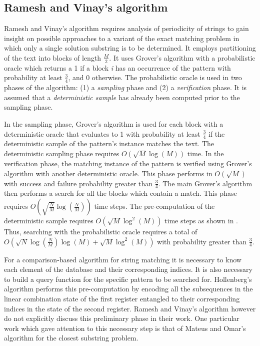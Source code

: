 \subsection{Ramesh and Vinay's algorithm}
Ramesh and Vinay's algorithm requires analysis of periodicity of strings to gain insight on possible approaches to a variant of the exact matching problem in which only a single solution substring is to be determined. It employs partitioning of the text into blocks of length $\frac{M}{2}$. It uses Grover's algorithm with a probabilistic oracle which returns a 1 if a block \textit{i} has an occurrence of the pattern with probability at least $\frac{3}{4}$, and 0 otherwise. The probabilistic oracle is used in two phases of the algorithm: (1) a \textit{sampling} phase and (2) a \textit{verification} phase. It is assumed that a \textit{deterministic sample} \cite{Vishkin1990} has already been computed prior to the sampling phase.

In the sampling phase, Grover's algorithm is used for each block with a deterministic oracle that evaluates to 1 with probability at least $\frac{3}{4}$ if the deterministic sample of the pattern's instance matches the text. The deterministic sampling phase requires $O(\sqrt{M}\log(M))$ time. In the verification phase, the matching instance of the pattern is verified using Grover's algorithm with another deterministic oracle. This phase performs in $O(\sqrt{M})$ with success and failure probability greater than $\frac{3}{4}$. The main Grover's algorithm then performs a search for all the blocks which contain a match. This phase requires $O(\sqrt{\frac{N}{M}}\log(\frac{N}{M}))$ time steps. The pre-computation of the deterministic sample requires $O(\sqrt{M}\log^2(M))$ time steps as shown in \cite{Ramesh2003}. Thus, searching with the probabilistic oracle requires a total of $O(\sqrt{N}\log(\frac{N}{M})\log(M) + \sqrt{M}\log^2(M))$ with probability greater than $\frac{3}{4}$.

For a comparison-based algorithm for string matching it is necessary to know each element of the database and their corresponding indices. It is also necessary to build a query function for the specific pattern to be searched for. Hollenberg's algorithm performs this pre-computation by encoding all the subsequences in the linear combination state of the first register entangled to their corresponding indices in the state of the second register. Ramesh and Vinay's algorithm however do not explicitly discuss this preliminary phase in their work. One particular work which gave attention to this necessary step is that of Mateus and Omar's algorithm for the closest substring problem.

